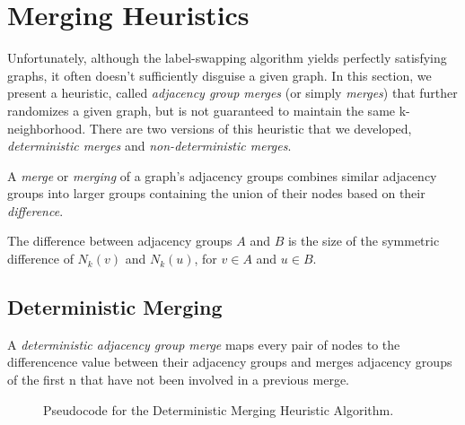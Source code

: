 \section{Merging Heuristics}
\indent Unfortunately, although the label-swapping algorithm yields perfectly satisfying graphs, it often doesn't sufficiently disguise a given graph.  In this section, we present a heuristic, called \emph{adjacency group merges} (or simply \emph{merges}) that further randomizes a given graph, but is not guaranteed to maintain the same k-neighborhood. There are two versions of this heuristic that we developed, \emph{deterministic merges} and \emph{non-deterministic merges}.

\begin{dfn}
\noindent A \emph{merge} or \emph{merging} of a graph's adjacency groups combines similar adjacency groups into larger groups containing the union of their nodes based on their \emph{difference}.
\end{dfn}

\begin{dfn}
The difference between adjacency groups $A$ and $B$ is the size of the symmetric difference of $N_k(v)$ and $N_k(u)$, for $v \in A$ and $u \in B$. 
\end{dfn}

\subsection{Deterministic Merging}

\begin{dfn}
A \emph{deterministic adjacency group merge} maps every pair of nodes to  the differencence value between their adjacency groups and merges adjacency groups of the first n that have not been involved in a previous merge.
\end{dfn}

\begin{figure}[htb]
	\begin{algorithmic}
		\renewcommand{\algorithmicrequire}{\textbf{Input:}}
		\renewcommand{\algorithmicensure}{\textbf{Output:}}
			\EndFor
		\EndFor
		\EndFor
			\EndIf
		\EndIf
	\end{algorithmic}
	\caption{Pseudocode for the Deterministic Merging Heuristic Algorithm.}
	\label{fig:deterministic-merging}
\end{figure}

